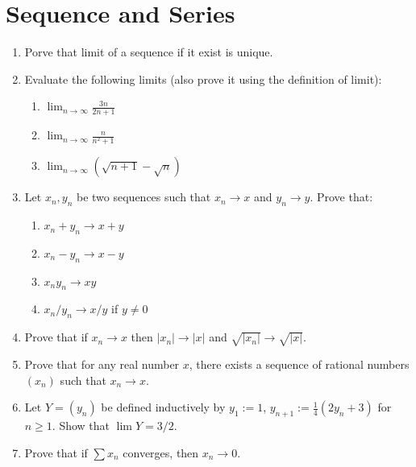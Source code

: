 \documentclass[12pt]{article}
\begin{document}
\newpage

\section{Sequence and Series}

\begin{enumerate}
    \item Porve that limit of a sequence if it exist is unique.
    \item Evaluate the following limits (also prove it using the definition of limit):
    \begin{enumerate}
        \item \( \lim_{n \to \infty} \frac{3n}{2n+1} \)
        \item \( \lim_{n \to \infty} \frac{n}{n^2 + 1} \)
        \item \( \lim_{n \to \infty} (\sqrt{n+1} - \sqrt n) \)
    \end{enumerate}
    \item Let $x_n,y_n$ be two sequences such that $x_n \to x$ and $y_n \to y$. Prove that:
    \begin{enumerate}
        \item \( x_n + y_n \to x + y \)
        \item \( x_n - y_n \to x - y \)
        \item \( x_n y_n \to xy \)
        \item \( x_n / y_n \to x/y \) if \( y \neq 0 \)
    \end{enumerate}
    \item Prove that if $x_n\to x$ then $|x_n|\to|x|$ and $\sqrt{|x_n|}\to\sqrt{|x|}$.
    \item Prove that for any real number $x$, there exists a sequence of rational numbers $(x_n)$ such that $x_n \to x$.
    \item Let $Y = (y_n)$ be defined inductively by $y_1 := 1$, $y_{n+1} := \frac{1}{4}(2y_n+3)$ for $n \ge 1$. Show that $\lim Y = 3/2$.
    \item Prove that if $\sum x_n$ converges, then $x_n \to 0$.
\end{enumerate}
\end{document}
